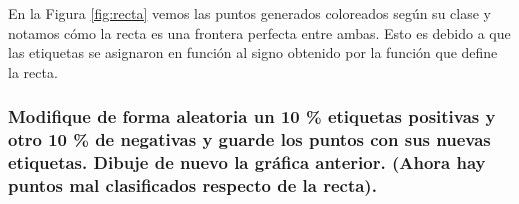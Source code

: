 \documentclass[a4paper, 20pt]{article}
\begin{document}
En la Figura \ref{fig:recta} vemos las puntos generados coloreados según su clase y notamos cómo la recta es una frontera perfecta entre ambas. Esto es debido a que las etiquetas se asignaron en función al signo obtenido por la función que define la recta.

\subsubsection{Modifique de forma aleatoria un 10 \% etiquetas positivas y otro 10 \% de negativas y guarde los puntos con sus nuevas etiquetas. Dibuje de nuevo la gráfica anterior. (Ahora hay puntos mal clasificados respecto de la recta).}

\newpage
\printbibliography
\end{document}
